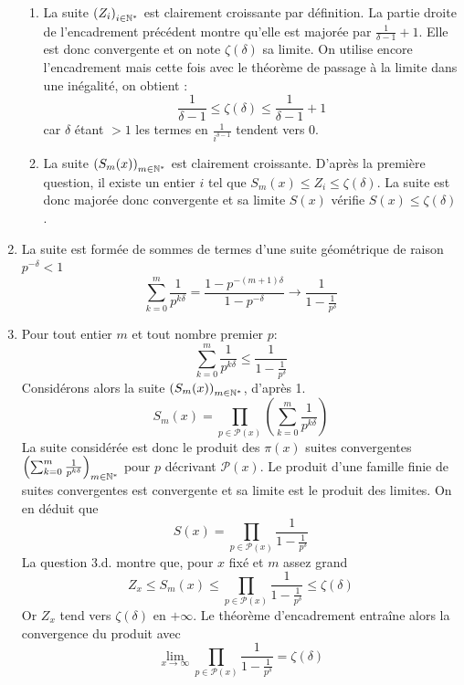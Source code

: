 \begin{enumerate}
\begin{enumerate}
\item La suite $\left( Z_i \right)_{i\in\mathbb{N}^*}$ est clairement croissante par définition. La partie droite de l'encadrement précédent montre qu'elle est majorée par $\frac{1}{\delta -1}+1$. Elle est donc convergente et on note $\zeta(\delta)$ sa limite.\newline
On utilise encore l'encadrement mais cette fois avec le théorème de passage à la limite dans une inégalité, on obtient :
\begin{displaymath}
 \frac{1}{\delta -1} \leq \zeta(\delta) \leq \frac{1}{\delta -1} +1
\end{displaymath}
car $\delta$ étant $>1$ les termes en $\frac{1}{i^{\delta-1}}$ tendent vers $0$. 
\item La suite $\left(S_m(x) \right)_{m\in\mathbb{N}^*}$ est clairement croissante. D'après la première question, il existe un entier $i$ tel que $S_m(x)\leq Z_i\leq \zeta(\delta)$. La suite est donc majorée donc convergente et sa limite $S(x)$ vérifie $S(x)\leq\zeta(\delta)$.
\end{enumerate}
\item La suite est formée de sommes de termes d'une suite géométrique de raison $p^{-\delta}<1$
\begin{displaymath}
 \sum_{k=0}^{m}\frac{1}{p^{k\delta}}=\dfrac{1-p^{-(m+1)\delta}}{1-p^{-\delta}}\rightarrow \dfrac{1}{1-\frac{1}{p^\delta}}
\end{displaymath}
\item Pour tout entier $m$ et tout nombre premier $p$:
\begin{displaymath}
 \sum_{k=0}^{m}\frac{1}{p^{k\delta}}\leq \dfrac{1}{1-\frac{1}{p^\delta}}
\end{displaymath}
Considérons alors la suite  $\left(S_m(x)\right)_{m\in\mathbb{N}^*}$, d'après 1.
\begin{displaymath}
 S_m(x)=\prod_{p\in \mathcal P(x)}\left( \sum_{k=0}^{m}\frac{1}{p^{k\delta}}\right)
\end{displaymath}
La suite considérée est donc le produit des $\pi(x)$ suites convergentes $\left( \sum_{k=0}^{m}\frac{1}{p^{k\delta}}\right)_{m\in \mathbb{N}^*}$ pour $p$ décrivant $\mathcal P(x)$. Le produit d'une famille finie de suites convergentes est convergente et sa limite est le produit des limites. On en déduit que
\begin{displaymath}
 S(x)=\prod_{p\in \mathcal P(x)}\dfrac{1}{1-\frac{1}{p^\delta}}
\end{displaymath}
La question 3.d. montre que, pour $x$ fixé et $m$ assez grand 
\begin{displaymath}
 Z_x\leq S_m(x)\leq \prod_{p\in \mathcal P(x)}\dfrac{1}{1-\frac{1}{p^\delta}}\leq \zeta(\delta)
\end{displaymath}
Or $Z_x$ tend vers $\zeta(\delta)$ en $+\infty$. Le théorème d'encadrement entraîne alors la convergence du produit avec
\begin{displaymath}
  \lim_{x\rightarrow \infty }\prod_{p\in \mathcal P(x)}\frac{1}{1-\frac{1}{p^\delta}}=\zeta(\delta)
\end{displaymath}
\end{enumerate}

